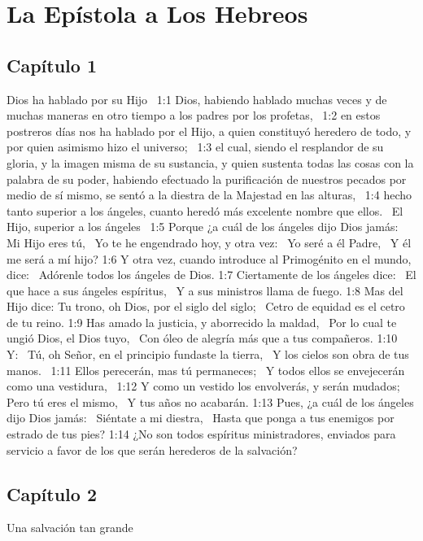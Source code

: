 \chapter{La Epístola a Los Hebreos}


\section*{Capítulo 1 }
Dios ha hablado por su Hijo  
1:1 Dios, habiendo hablado muchas veces y de muchas maneras en otro tiempo a los padres por los profetas,  
1:2 en estos postreros días nos ha hablado por el Hijo, a quien constituyó heredero de todo, y por quien asimismo hizo el universo;  
1:3 el cual, siendo el resplandor de su gloria, y la imagen misma de su sustancia, y quien sustenta todas las cosas con la palabra de su poder, habiendo efectuado la purificación de nuestros pecados por medio de sí mismo, se sentó a la diestra de la Majestad en las alturas,  
1:4 hecho tanto superior a los ángeles, cuanto heredó más excelente nombre que ellos.  
El Hijo, superior a los ángeles  
1:5 Porque ¿a cuál de los ángeles dijo Dios jamás:  
Mi Hijo eres tú,  
Yo te he engendrado hoy, 
y otra vez:  
Yo seré a él Padre,  
Y él me será a mí hijo? 
1:6 Y otra vez, cuando introduce al Primogénito en el mundo, dice:  
Adórenle todos los ángeles de Dios. 
1:7 Ciertamente de los ángeles dice:  
El que hace a sus ángeles espíritus,  
Y a sus ministros llama de fuego. 
1:8 Mas del Hijo dice: Tu trono, oh Dios, por el siglo del siglo;  
Cetro de equidad es el cetro de tu reino. 
1:9 Has amado la justicia, y aborrecido la maldad,  
Por lo cual te ungió Dios, el Dios tuyo,  
Con óleo de alegría más que a tus compañeros. 
1:10 Y:  
Tú, oh Señor, en el principio fundaste la tierra,  
Y los cielos son obra de tus manos.  
1:11 Ellos perecerán, mas tú permaneces;  
Y todos ellos se envejecerán como una vestidura,  
1:12 Y como un vestido los envolverás, y serán mudados;  
Pero tú eres el mismo,  
Y tus años no acabarán. 
1:13 Pues, ¿a cuál de los ángeles dijo Dios jamás:  
Siéntate a mi diestra,  
Hasta que ponga a tus enemigos por estrado de tus pies? 
1:14 ¿No son todos espíritus ministradores, enviados para servicio a favor de los que serán herederos de la salvación?  
\section*{Capítulo 2}
Una salvación tan grande  

